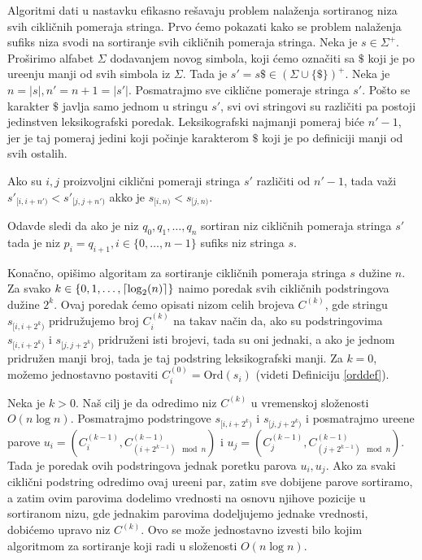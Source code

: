 Algoritmi dati u nastavku efikasno re\v savaju problem nala\v zenja sortiranog niza svih cikli\v cnih pomeraja stringa. Prvo \' cemo pokazati kako se problem nala\v zenja sufiks niza svodi na sortiranje svih cikli\v cnih pomeraja stringa. Neka je $s \in \Sigma^+$. Pro\v sirimo alfabet $\Sigma$ dodavanjem novog simbola, koji \' cemo ozna\v citi sa $\$$ koji je po ure\dj enju manji od svih simbola iz $\Sigma$. Tada je $s' = s\$ \in (\Sigma \cup \{\$\})^+$. Neka je $n = |s|, n' = n+1 = |s'|$. Posmatrajmo sve cikli\v cne pomeraje stringa $s'$. Po\v sto se karakter $\$$ javlja samo jednom u stringu $s'$, svi ovi stringovi su razli\v citi pa postoji jedinstven leksikografski poredak. Leksikografski najmanji pomeraj bi\' ce $n'-1$, jer je taj pomeraj jedini koji po\v cinje karakterom $\$$ koji je po definiciji manji od svih ostalih.

\begin{thm}
Ako su $i,j$ proizvoljni cikli\v cni pomeraji stringa $s'$ razli\v citi od $n'-1$, tada va\v zi $s'_{[i, i+n')} < s'_{[j, j+n')}$ akko je $s_{[i, n)} < s_{[j, n)}$.
\end{thm}

Odavde sledi da ako je niz $q_0, q_1, \ldots, q_n$ sortiran niz cikli\v cnih pomeraja stringa $s'$ tada je niz $p_i = q_{i+1}, i \in \{0, \ldots, n-1\}$ sufiks niz stringa $s$.

\noindent
\begin{minipage}[l]{\textwidth}

\end{minipage}

Kona\v cno, opi\v simo algoritam za sortiranje cikli\v cnih pomeraja stringa $s$ du\v zine $n$. Za svako $k \in \{0, 1, \ldots, \left \lceil \log_2(n) \right \rceil \}$ na\dj imo poredak svih cikli\v cnih podstringova du\v zine $2^k$. Ovaj poredak \' cemo opisati nizom celih brojeva $C^{(k)}$, gde stringu $s_{[i, i+2^k)}$ pridru\v zujemo broj $C^{(k)}_i$ na takav na\v cin da, ako su podstringovima $s_{[i, i+2^k)}$ i $s_{[j, j+2^k)}$ pridru\v zeni isti brojevi, tada su oni jednaki, a ako je jednom pridru\v zen manji broj, tada je taj podstring leksikografski manji. Za $k=0$, mo\v zemo jednostavno postaviti $C^{(0)}_i = \text{Ord}(s_i)$ (videti Definiciju \ref{orddef}).

Neka je $k>0$. Na\v s cilj je da odredimo niz $C^{(k)}$ u vremenskoj slo\v zenosti $O(n \log n)$. Posmatrajmo podstringove $s_{[i, i+2^k)}$ i $s_{[j, j+2^k)}$ i posmatrajmo ure\dj ene parove $u_i = (C^{(k-1)}_i, C^{(k-1)}_{(i+2^{k-1}) \mod n })$ i $u_j = (C^{(k-1)}_j, C^{(k-1)}_{(j+2^{k-1}) \mod n })$. Tada je poredak ovih podstringova jednak poretku parova $u_i, u_j$. Ako za svaki cikli\v cni podstring odredimo ovaj ure\dj eni par, zatim sve dobijene parove sortiramo, a zatim ovim parovima dodelimo vrednosti na osnovu njihove pozicije u sortiranom nizu, gde jednakim parovima dodeljujemo jednake vrednosti, dobi\' cemo upravo niz $C^{(k)}$. Ovo se mo\v ze jednostavno izvesti bilo kojim algoritmom za sortiranje koji radi u slo\v zenosti $O(n \log n)$.

